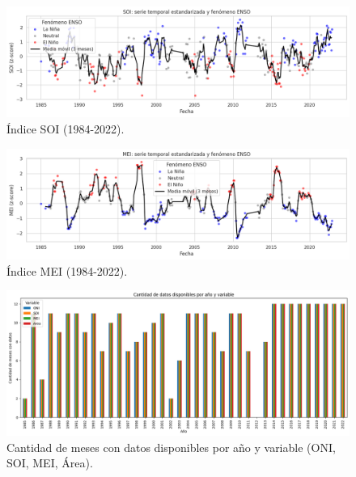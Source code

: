 \begin{figure}[ht]
        \centering
        \includegraphics[scale=.45]
        {Figures/fig18_ts_soi.png}
        \caption{Índice SOI (1984-2022).}
        \label{fig:indice_soi_ts}
\end{figure}

\begin{figure}[ht]
        \centering
        \includegraphics[scale=.45]
        {Figures/fig19_ts_mei.png}
        \caption{Índice MEI (1984-2022).}
        \label{fig:indice_mei_ts}
\end{figure}

\begin{figure}[htpb]
    \centering
    \includegraphics[scale=.40]{Figures/conteo_series.png}
    \caption{Cantidad de meses con datos disponibles por año y variable (ONI, SOI, MEI, Área).}
    \label{fig:conteo_datos}
\end{figure}

